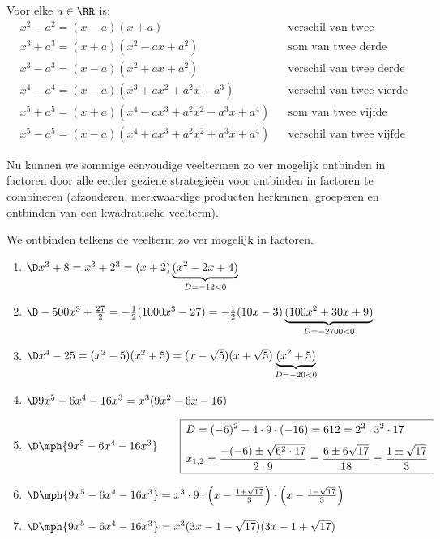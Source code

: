 \documentclass{ximera}
\begin{document}
\begin{eigenschap}
Voor elke $a \in \RR$ is:
\begin{align*}
& x^2 - a^2 = (x-a)(x+a) && \text{verschil van twee kwadraten} \\
& x^3 + a^3 = (x+a)(x^2 - ax + a^2) && \text{som van twee derde machten} \\
& x^3 - a^3 = (x-a)(x^2 + ax + a^2) && \text{verschil van twee derde machten} \\
& x^4 - a^4 = (x-a)(x^3 + ax^2 + a^2x + a^3) && \text{verschil van twee vierde machten} \\
& x^5 + a^5 = (x+a)(x^4 - ax^3 + a^2x^2 - a^3x + a^4) && \text{som van twee vijfde machten} \\
& x^5 - a^5 = (x-a)(x^4 + ax^3 + a^2x^2 + a^3x + a^4) && \text{verschil van twee vijfde machten.}
\end{align*}
\end{eigenschap}


Nu kunnen we sommige eenvoudige veeltermen zo ver mogelijk ontbinden in factoren door alle eerder geziene strategie\"en voor ontbinden in factoren te combineren (afzonderen, merkwaardige producten herkennen, groeperen en ontbinden van een kwadratische veelterm).

\begin{example}
We ontbinden telkens de veelterm zo ver mogelijk in factoren. 
\begin{enumerate}

\item 
$\D x^3 + 8 = x^3 + 2^3 = (x+2)\underbrace{(x^2-2x+4)}_{D = -12 < 0}$
\item
$\D -500x^3 + \frac{27}{2} = -\frac{1}{2}(1000x^3 - 27) = -\frac{1}{2}(10x-3)\underbrace{(100x^2 + 30x + 9)}_{D = -2700 < 0}$
\item
$\D x^4-25 = (x^2 - 5)(x^2+5) = (x-\sqrt{5})(x+\sqrt{5})\underbrace{(x^2+5)}_{D = -20 < 0}$
\item
$\D 9x^5 - 6x^4 - 16x^3 = x^3(9x^2-6x-16)$ 
\item[]
$\D \mph{9x^5 - 6x^4 - 16x^3} \qquad 
\begin{array}{|l}
\hline
\begin{aligned}
\vrule height 0.4cm width 0cm
& D = (-6)^2-4\cdot 9 \cdot (-16) = 612 = 2^2 \cdot 3^2 \cdot 17 \\[0.1cm] 
& x_{1,2} = \frac{-(-6) \pm \sqrt{6^2 \cdot 17}}{2 \cdot 9} = \frac{6 \pm 6\sqrt{17}}{18} = \frac{1 \pm \sqrt{17}}{3} \\[0.1cm] 
\end{aligned} \\
\hline
\end{array}
$
\item[]
$\D \mph{9x^5 - 6x^4 - 16x^3} = x^3 \cdot 9 \cdot \left(x-\frac{1+\sqrt{17}}{3}\right)\cdot\left(x-\frac{1-\sqrt{17}}{3}\right)$
\item[]
$\D \mph{9x^5 - 6x^4 - 16x^3} = x^3(3x-1-\sqrt{17})(3x-1+\sqrt{17})$
\end{enumerate}
\end{example}
\end{document}
